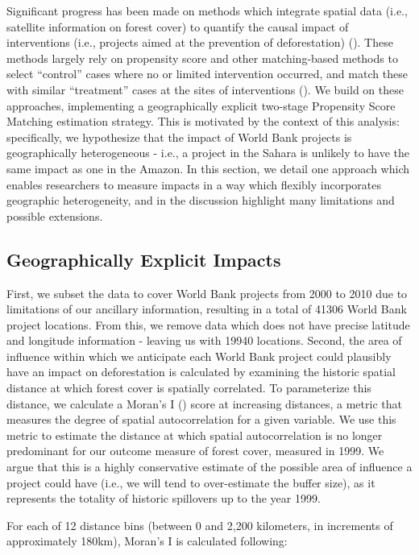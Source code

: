 \documentclass{article}\usepackage[]{graphicx}\usepackage[]{color}
\newenvironment{knitrout}{}{}  %
\begin{document}
\begin{knitrout}
Significant progress has been made on methods which integrate spatial data (i.e., satellite information on forest cover) to quantify the causal impact of interventions (i.e., projects aimed at the prevention of deforestation) (\cite{nelson_effectiveness_2011}).  
These methods largely rely on propensity score and other matching-based methods to select ``control'' cases where no or limited intervention occurred, and match these with similar ``treatment'' cases at the sites of interventions (\cite{andam_measuring_2008}). 
We build on these approaches, implementing a geographically explicit two-stage Propensity Score Matching estimation strategy.
This is motivated by the context of this analysis: specifically, we hypothesize that the impact of World Bank projects is geographically heterogeneous - i.e., a project in the Sahara is unlikely to have the same impact as one in the Amazon.
In this section, we detail one approach which enables researchers to measure impacts in a way which flexibly incorporates geographic heterogeneity, and in the discussion highlight many limitations and possible extensions.


\subsection{Geographically Explicit Impacts}
First, we subset the data to cover World Bank projects from 2000 to 2010 due to limitations of our ancillary information, resulting in a total of 41306 World Bank project locations. 
From this, we remove data which does not have precise latitude and longitude information - leaving us with 19940 locations.
Second, the area of influence within which we anticipate each World Bank project could plausibly have an impact on deforestation is calculated by examining the historic spatial distance at which forest cover is spatially correlated. 
To parameterize this distance, we calculate a Moran's I (\cite{getis_analysis_1992}) score at increasing distances, a metric that measures the degree of spatial autocorrelation for a given variable.
We use this metric to estimate the distance at which spatial autocorrelation is no longer predominant for our outcome measure of forest cover, measured in 1999.  
We argue that this is a highly conservative estimate of the possible area of influence a project could have (i.e., we will tend to over-estimate the buffer size), as it represents the totality of historic spillovers up to the year 1999.

\par
For each of 12 distance bins (between 0 and 2,200 kilometers, in increments of approximately 180km), Moran's I is calculated following:


\end{knitrout}
\end{document}
